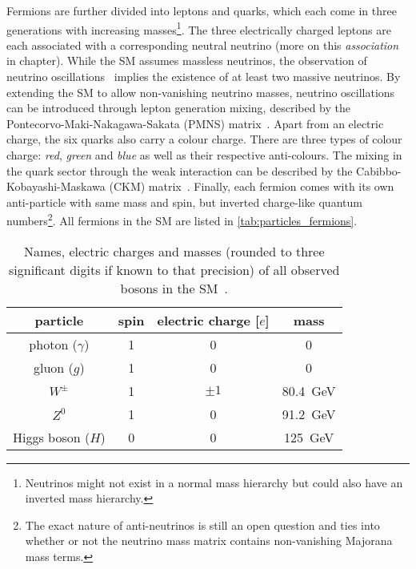 
Fermions are further divided into leptons and quarks, which each come in three generations with increasing masses\footnote{Neutrinos might not exist in a normal mass hierarchy but could also have an inverted mass hierarchy.}. The three electrically charged leptons are each associated with a corresponding neutral neutrino (more on this \textit{association} in chapter). While the SM assumes massless neutrinos, the observation of neutrino oscillations~\cite{Fukuda:1998mi} implies the existence of at least two massive neutrinos. By extending the SM to allow non-vanishing neutrino masses, neutrino oscillations can be introduced through lepton generation mixing, described by the Pontecorvo-Maki-Nakagawa-Sakata (PMNS) matrix~\cite{PMNS:1962mu}. Apart from an electric charge, the six quarks also carry a colour charge. There are three types of colour charge: \textit{red}, \textit{green} and \textit{blue} as well as their respective anti-colours. The mixing in the quark sector through the weak interaction can be described by the Cabibbo-Kobayashi-Maskawa (CKM) matrix~\cite{CKM:1973fv}. Finally, each fermion comes with its own anti-particle with same mass and spin, but inverted charge-like quantum numbers\footnote{The exact nature of anti-neutrinos is still an open question and ties into whether or not the neutrino mass matrix contains non-vanishing Majorana mass terms.}. All fermions in the SM are listed in \cref{tab:particles_fermions}.


\begin{table}
	\centering
	\setlength\heavyrulewidth{0.2ex}
	\small
	\caption{Names, electric charges and masses (rounded to three significant digits if known to that precision) of all observed bosons in the SM~\cite{pdg}.}
	\begin{tabular} {c c c c}
	\toprule
		particle & spin & electric charge [$e$]& mass \\ 
	\midrule
		photon ($\gamma$) & 1 & 0 & 0\\
		gluon ($g$) & 1 & 0 & 0 \\
		$W^\pm$ & 1 & $\pm 1$ & \SI{80.4}{\GeV} \\
		$Z^0$ & 1 & 0 & \SI{91.2}{\GeV} \\
		Higgs boson ($H$) & 0 & 0 & \SI{125}{\GeV} \\
	\bottomrule					
	\end{tabular}\vspace{3mm}
	\label{tab:particles_bosons}   
\end{table}

